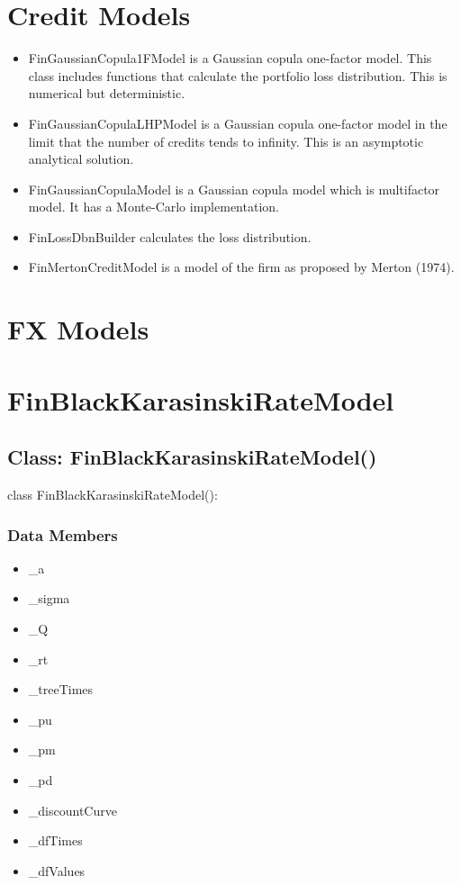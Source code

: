 \documentclass[twoside,11pt]{book}
\begin{document}
\section*{Credit Models}
\begin{itemize}
\item{ FinGaussianCopula1FModel is a Gaussian copula one-factor model. This class includes functions that calculate the portfolio loss distribution. This is numerical but deterministic.
}
\item{ FinGaussianCopulaLHPModel is a Gaussian copula one-factor model in the limit that the number of credits tends to infinity. This is an asymptotic analytical solution.
}
\item{ FinGaussianCopulaModel is a Gaussian copula model which is multifactor model. It has a Monte-Carlo implementation.
}
\item{ FinLossDbnBuilder calculates the loss distribution.
}
\item{ FinMertonCreditModel is a model of the firm as proposed by Merton (1974).
}
\end{itemize}


\section*{FX Models}
\newpage
\section{FinBlackKarasinskiRateModel}

\subsection*{Class: FinBlackKarasinskiRateModel()}
class FinBlackKarasinskiRateModel(): 

\subsubsection*{Data Members}
\begin{itemize}
\item{\_a}
\item{\_sigma}
\item{\_Q}
\item{\_rt}
\item{\_treeTimes}
\item{\_pu}
\item{\_pm}
\item{\_pd}
\item{\_discountCurve}
\item{\_dfTimes}
\item{\_dfValues}
\end{itemize}
\end{document}
